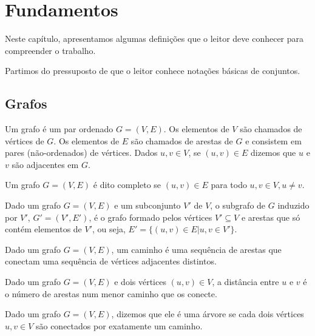 \chapter{Fundamentos}
\label{cap:fundamentos}

Neste capítulo, apresentamos algumas definições que o leitor deve conhecer para compreender o trabalho.

Partimos do pressuposto de que o leitor conhece notações básicas de conjuntos.

\section{Grafos}

\begin{definition}[grafo]
  \cite{defgrafo}
  Um grafo é um par ordenado $G = (V, E)$. Os elementos de $V$ são chamados de vértices de $G$. Os elementos de $E$ são chamados de arestas de $G$ e consistem em pares (não-ordenados) de vértices. Dados $u, v \in V$, se $(u, v) \in E$ dizemos que $u$ e $v$ são adjacentes em $G$.
\end{definition}

\begin{definition}
  \cite{defgrafocompleto}
  Um grafo $G = (V, E)$ é dito completo se $(u, v) \in E$ para todo $u, v \in V, u \neq v$.
\end{definition}

\begin{definition}
  \cite{defsubgrafo}
  Dado um grafo $G = (V, E)$ e um subconjunto $V'$ de $V$, o subgrafo de $G$ induzido por $V'$, $G' = (V', E')$, é o grafo formado pelos vértices $V' \subseteq V$ e arestas que só contém elementos de $V'$, ou seja, $E' = \{(u, v) \in E | u, v \in V'\}$.
\end{definition}

\begin{definition}[caminho]
  \cite{defcaminho}
  Dado um grafo $G = (V, E)$, um caminho é uma sequência de arestas que conectam uma sequência de vértices adjacentes distintos.
\end{definition}

\begin{definition}[distância]
  \cite{defdistancia}
  Dado um grafo $G = (V, E)$ e dois vértices $(u, v) \in V$, a distância entre $u$ e $v$ é o número de arestas num menor caminho que os conecte.
\end{definition}

\begin{definition}[árvore]
  \cite{defarvore}
  Dado um grafo $G = (V, E)$, dizemos que ele é uma árvore se cada dois vértices $u, v \in V$ são conectados por exatamente um caminho.
\end{definition}

